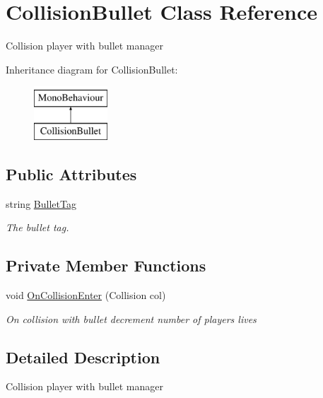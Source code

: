 \hypertarget{class_collision_bullet}{}\section{Collision\+Bullet Class Reference}
\label{class_collision_bullet}


Collision player with bullet manager  


Inheritance diagram for Collision\+Bullet\+:\begin{figure}[H]
\begin{center}
\leavevmode
\includegraphics[height=2.000000cm]{class_collision_bullet}
\end{center}
\end{figure}
\subsection*{Public Attributes}
\begin{DoxyCompactItemize}
\item 
string \mbox{\hyperlink{class_collision_bullet_a98c6bc7c9224385999fe1226cf3c1aee}{Bullet\+Tag}}
\begin{DoxyCompactList}\small\item\em The bullet tag. \end{DoxyCompactList}\end{DoxyCompactItemize}
\subsection*{Private Member Functions}
\begin{DoxyCompactItemize}
\item 
void \mbox{\hyperlink{class_collision_bullet_a3267b5fa5550db284da7c7cbf25498f1}{On\+Collision\+Enter}} (Collision col)
\begin{DoxyCompactList}\small\item\em On collision with bullet decrement number of player\textquotesingle{}s lives \end{DoxyCompactList}\end{DoxyCompactItemize}


\subsection{Detailed Description}
Collision player with bullet manager 



